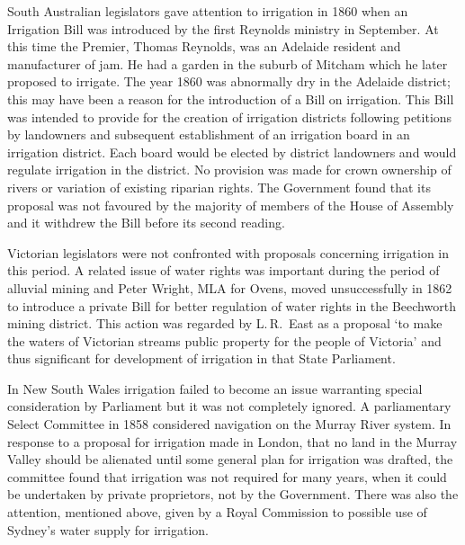 South Australian  legislators gave attention to
irrigation in 1860 when an Irrigation Bill was introduced by the first
Reynolds ministry in Sept\-em\-ber.  At this time the Premier, Thomas
Reynolds,  was an Adelaide resident and
manufacturer of jam.  He had a garden in the suburb
of Mitcham  which he later proposed to irrigate.
The year 1860 was abnormally dry in the Adelaide district; this may
have been a reason for the introduction of a Bill on irrigation.  This
Bill was intended to provide for the creation of irrigation districts
following petitions by landowners and subsequent establishment of an
irrigation board in an irrigation district. Each board would be
elected by district landowners and would regulate irrigation in the
district.  No provision was made for crown ownership of rivers or
variation of existing riparian rights.  The
Government found that its proposal was not favoured by the majority of
members of the House of Assembly and it withdrew the Bill before its
second reading.

Victorian  legislators were not confronted with
proposals concerning irrigation in this period.  A related issue of
water rights was important during the period of alluvial mining and
Peter Wright,  MLA for Ovens, moved unsuccessfully
in 1862 to introduce a private Bill for better regulation of water
rights in the Beechworth mining district.  This action was regarded by
L.\,R.~East  as a proposal `to make the waters of
Victorian streams public property for the people of Victoria' and thus
significant for development of irrigation in that State
Parliament.

In New South Wales  irrigation failed to become
an issue warranting special consideration by Parliament but it was not
completely ignored.  A parliamentary Select Committee in 1858
considered navigation on the Murray River system.  In response to a
proposal for irrigation made in London, that no land in the Murray
Valley should be alienated until some general plan for irrigation was
drafted, the committee found that irrigation was not required for many
years, when it could be undertaken by private proprietors, not by the
Government.  There was also the attention, mentioned above, given by a
Royal Commission to possible use of Sydney's water supply for
irrigation.



